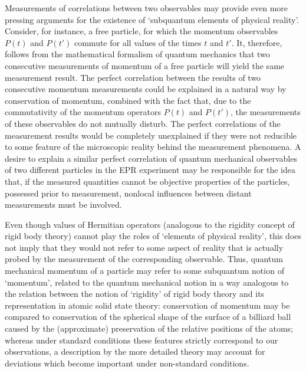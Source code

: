 \documentclass[12pt]{article}
\begin{document}
Measurements of correlations between two observables may provide
even more pressing arguments for the existence of `subquantum
elements of physical reality'. Consider, for instance, a free
particle, for which the momentum observables $P(t)$ and $P(t')$
commute for all values of the times $t$ and $t'$. It, therefore,
follows from the mathematical formalism of quantum mechanics that
two consecutive measurements of momentum of a free particle will
yield the same measurement result. The perfect correlation between
the results of two consecutive momentum measurements could be
explained in a natural way by conservation of momentum, combined
with the fact that, due to the commutativity of the momentum
operators $P(t)$ and $P(t')$, the measurements of these
observables do not mutually disturb. The perfect correlations of
the measurement results would be completely unexplained if they
were not reducible to some feature of the microscopic reality
behind the measurement phenomena. A desire to explain a similar
perfect correlation of quantum mechanical observables of two
different particles in the EPR experiment may be responsible for
the idea that, if the measured quantities cannot be objective
properties of the particles, possessed prior to measurement,
nonlocal influences between distant measurements must be involved.

Even though values of Hermitian operators (analogous to the
rigidity concept of rigid body theory) cannot play the roles of
`elements of physical reality', this does not imply that they
would not refer to some aspect of reality that is actually probed
by the measurement of the corresponding observable. Thus, quantum
mechanical momentum of a particle may refer to some subquantum
notion of `momentum', related to the quantum mechanical notion in
a way analogous to the relation between the notion of `rigidity'
of rigid body theory and its representation in atomic solid state
theory: conservation of momentum may be compared to conservation
of the spherical shape of the surface of a billiard ball caused by
the (approximate) preservation of the relative positions of the
atoms; whereas under standard conditions these features strictly
correspond to our observations, a description by the more detailed
theory may account for deviations which become important under
non-standard conditions.
\end{document}
